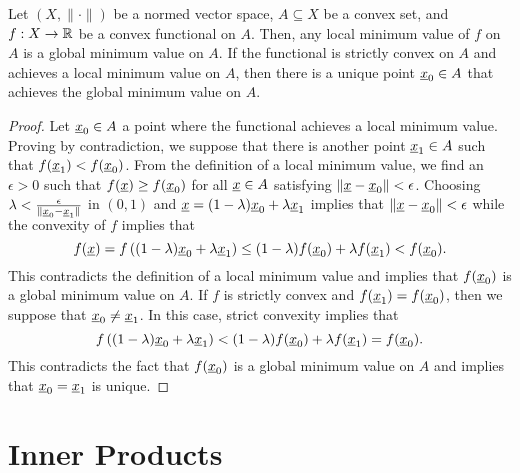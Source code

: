 \begin{theorem}
Let $(X,\|\cdot\|)$ be a normed vector space, $A \subseteq X$ be a convex set, and $f: X \rightarrow \mathbb{R}$ be a convex functional on $A$.
Then, any local minimum value of $f$ on $A$ is a global minimum value on $A$.
If the functional is strictly convex on $A$ and achieves a local minimum value on $A$, then there is a unique point $\underline{x}_0 \in A$ that achieves the global minimum value on $A$.
\end{theorem}
\begin{proof}
Let $\underline{x}_0 \in A$ a point where the functional achieves a local minimum value.
Proving by contradiction, we suppose that there is another point $\underline{x}_1 \in A$ such that $f(\underline{x}_1) <f(\underline{x}_0)$.
From the definition of a local minimum value, we find an $\epsilon > 0$ such that $f(\underline{x}) \geq f(\underline{x}_0)$ for all $\underline{x} \in A$ satisfying $\| \underline{x} - \underline{x}_0 \| < \epsilon$.
Choosing $\lambda < \frac{\epsilon}{\smash{\| \underline{x}_0 - \underline{x}_1 \|}}$ in $(0,1)$ and $\underline{x} = (1-\lambda) \underline{x}_0 + \lambda \underline{x}_1$ implies that $\| \underline{x} - \underline{x}_0 \| < \epsilon $
while the convexity of $f$ implies that
\[ f( \underline{x} ) = f \left( (1-\lambda) \underline{x}_0 + \lambda \underline{x}_1 \right) \leq (1-\lambda) f(\underline{x}_0) + \lambda f(\underline{x}_1) < f(\underline{x}_0). \]
This contradicts the definition of a local minimum value and implies that $f(\underline{x}_0)$ is a global minimum value on $A$.
If $f$ is strictly convex and $f(\underline{x}_1) = f(\underline{x}_0)$, then we suppose that $\underline{x}_0 \neq \underline{x}_1$.
In this case, strict convexity implies that
\[ f \left( (1-\lambda) \underline{x}_0 + \lambda \underline{x}_1 \right) < (1-\lambda) f(\underline{x}_0) + \lambda f(\underline{x}_1) = f(\underline{x}_0). \]
This contradicts the fact that $f(\underline{x}_0)$ is a global minimum value on $A$ and implies that $\underline{x}_0 = \underline{x}_1$ is unique.
\end{proof}

\section{Inner Products}

